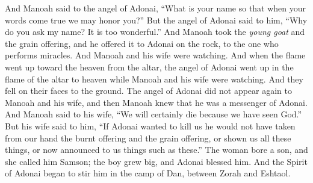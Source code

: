 \begin{biblechapter}
\verse And Manoah said to the angel of Adonai, “What is your name so that when your words come true we may honor you?”
\verse But the angel of Adonai said to him, “Why do you ask my name? It is too wonderful.”
\verse And Manoah took the \textit{young goat} and the grain offering, and he offered it to Adonai on the rock, to the one who performs miracles. And Manoah and his wife were watching.
\verse And when the flame went up toward the heaven from the altar, the angel of Adonai went up in the flame of the altar to heaven while Manoah and his wife were watching. And they fell on their faces to the ground.
\verse The angel of Adonai did not appear again to Manoah and his wife, and then Manoah knew that he was a messenger of Adonai.
\verse And Manoah said to his wife, “We will certainly die because we have seen God.”
\verse But his wife said to him, “If Adonai wanted to kill us he would not have taken from our hand the burnt offering and the grain offering, or shown us all these things, or now announced to us things such as these.”
\verse The woman bore a son, and she called him Samson; the boy grew big, and Adonai blessed him.
\verse And the Spirit of Adonai began to stir him in the camp of Dan, between Zorah and Eshtaol.
\end{biblechapter}

